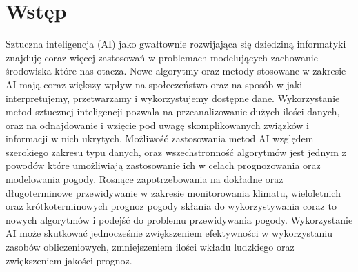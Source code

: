 



\section{Wstęp}

Sztuczna inteligencja (AI) jako gwałtownie rozwijająca się 
dziedziną informatyki znajduję coraz więcej zastosowań w 
problemach modelujących zachowanie środowiska które nas otacza. 
Nowe algorytmy oraz metody stosowane w zakresie AI mają coraz
większy wpływ na społeczeństwo oraz na sposób w jaki interpretujemy,
przetwarzamy i wykorzystujemy dostępne dane. Wykorzystanie metod
sztucznej inteligencji pozwala na przeanalizowanie dużych ilości
danych, oraz na odnajdowanie i wzięcie pod uwagę skomplikowanych związków
i informacji w nich ukrytych. Możliwość zastosowania metod AI względem 
szerokiego zakresu typu danych, oraz wszechstronność algorytmów jest jednym z 
powodów które umożliwiają zastosowanie ich w celach prognozowania oraz modelowania
pogody. Rosnące zapotrzebowania na dokładne oraz długoterminowe przewidywanie
w zakresie monitorowania klimatu, wieloletnich oraz krótkoterminowych prognoz
pogody skłania do wykorzystywania coraz to nowych algorytmów i podejść
do problemu przewidywania pogody. Wykorzystanie AI może skutkować jednocześnie 
zwiększeniem efektywności w wykorzystaniu zasobów obliczeniowych, zmniejszeniem
ilości wkładu ludzkiego oraz zwiększeniem jakości prognoz.

